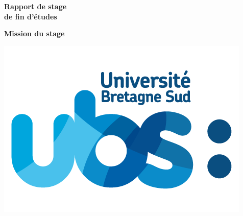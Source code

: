 \documentclass[french]{report}
\begin{document}
\begin{titlepage}
   \begin{flushright}
        { \Large \textbf{ \bfseries Rapport de stage \\ de fin d'études}}\\[1cm] 
   \end{flushright}
   
   \begin{center}
      \begin{framed}
        \Large{\textbf{Mission du stage
        }}
        \end{framed}
    \end{center}
    
    \begin{center}
        \includegraphics[scale=0.25]{Images/UBS-LOGO-RVB-Fd-Transparent.png}
        \label{fig:logo_entreprise}
    \end{center}
 \vspace{1cm}
    

\end{titlepage}
\end{document}
